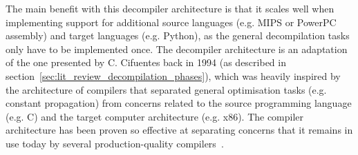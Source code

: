 The main benefit with this decompiler architecture is that it scales well when implementing support for additional source languages (e.g. MIPS or PowerPC assembly) and target languages (e.g. Python), as the general decompilation tasks only have to be implemented once. The decompiler architecture is an adaptation of the one presented by C. Cifuentes back in 1994 (as described in section~\ref{sec:lit_review_decompilation_phases}), which was heavily inspired by the architecture of compilers that separated general optimisation tasks (e.g. constant propagation) from concerns related to the source programming language (e.g. C) and the target computer architecture (e.g. x86). The compiler architecture has been proven so effective at separating concerns that it remains in use today by several production-quality compilers~\cite{llvm_architecture,gcc_architecture}.
